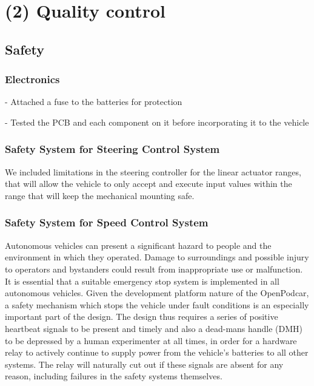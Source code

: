 \documentclass[a4paper]{article}
\begin{document}
\section{(2) Quality control}\label{h.f8237gmzmwc6}

\subsection{Safety}\label{h.v60aduckfisj}


\subsubsection{Electronics}

- Attached a fuse to the batteries for protection

- Tested the PCB and each component on it before incorporating it to the vehicle


\subsubsection{Safety System for Steering Control System}

We included limitations in the steering controller for the linear actuator ranges, that will allow the vehicle to only accept and execute input values within the range that will keep the mechanical mounting safe.


\subsubsection{Safety System for Speed Control System}

Autonomous vehicles can present a significant hazard to people and the environment in which they operated. Damage to surroundings and possible injury to operators and bystanders could result from inappropriate use or malfunction. It is essential that a suitable emergency stop system is implemented in all autonomous vehicles.   Given the development platform nature of the OpenPodcar, a safety mechanism which stops the vehicle under fault conditions is an especially important part of the design.   The design thus requires a series of positive heartbeat signals to be present and timely and also a dead-mans handle (DMH) to be depressed by a human experimenter at all times, in order for a hardware relay to actively continue to supply power from the vehicle’s batteries to all other systems.  The relay will naturally cut out if these signals are absent for any reason, including failures in the safety systems themselves.
\end{document}
